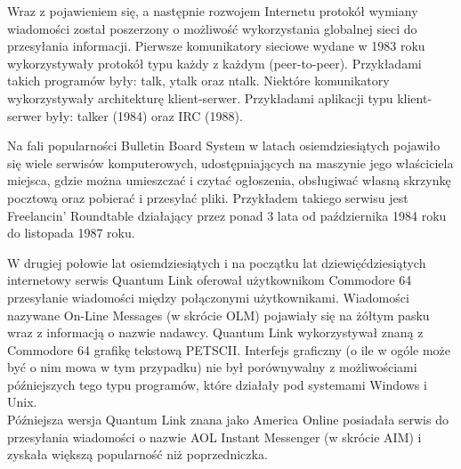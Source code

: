 \documentclass[a4paper,12pt]{article}
\begin{document}
\par Wraz z pojawieniem się, a następnie rozwojem Internetu protokół wymiany wiadomości został poszerzony o możliwość wykorzystania globalnej sieci do przesyłania informacji. Pierwsze komunikatory sieciowe wydane w 1983 roku wykorzystywały protokół typu każdy z każdym (peer-to-peer). Przykładami takich programów były: talk, ytalk oraz ntalk.
Niektóre komunikatory wykorzystywały architekturę klient-serwer. Przykładami aplikacji typu klient-serwer były: talker (1984) oraz IRC (1988).

\par Na fali popularności Bulletin Board System w latach osiemdziesiątych pojawiło się wiele serwisów komputerowych, udostępniających na maszynie jego właściciela miejsca, gdzie można umieszczać i czytać ogłoszenia, obsługiwać własną skrzynkę pocztową oraz pobierać i przesyłać pliki. Przykładem takiego serwisu jest Freelancin' Roundtable działający przez ponad 3 lata od października 1984 roku do listopada 1987 roku.

\par W drugiej połowie lat osiemdziesiątych i na początku lat dziewięćdziesiątych internetowy serwis Quantum Link oferował użytkownikom Commodore 64 przesyłanie wiadomości między połączonymi użytkownikami. Wiadomości nazywane On-Line Messages (w skrócie OLM) pojawiały się na żółtym pasku wraz z informacją o nazwie nadawcy. Quantum Link wykorzystywał znaną z Commodore 64 grafikę tekstową PETSCII. Interfejs graficzny (o ile w ogóle może być o nim mowa w tym przypadku) nie był porównywalny z możliwościami późniejszych tego typu programów, które działały pod systemami Windows i Unix.\\
Późniejsza wersja Quantum Link znana jako America Online posiadała serwis do przesyłania wiadomości o nazwie AOL Instant Messenger (w skrócie AIM) i zyskała większą popularność niż poprzedniczka.
\end{document}
